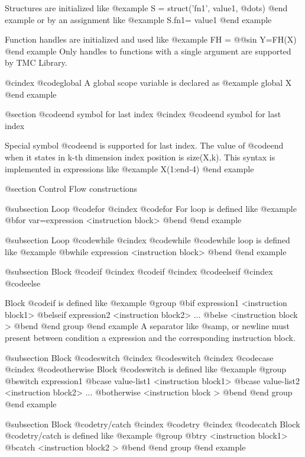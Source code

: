 Structures are initialized like
@example
 S =  struct('fn1', value1,  @dots{})
@end example
or by an assignment like
@example
 S.fn1= value1
@end example

Function handles are initialized and used like
@example
FH = @@sin   %
Y=FH(X) %
@end example
Only handles to functions with a single argument   are supported by TMC Library.



@cindex  @code{global}
A global scope variable is declared as
@example
 global X
@end example

@section @code{end} symbol for last index
@cindex  @code{end} symbol for last index

Special symbol @code{end} is supported for last index.
The value of @code{end} when it states in k-th dimension  index position is size(X,k).
This syntax is implemented in expressions like
@example
 X(1:end-4)
@end example



@section Control Flow  constructions

@subsection Loop @code{for}
@cindex  @code{for}
For loop is defined  like
@example
	@b{for} var=expression
		<instruction block>
	@b{end}
@end example

@subsection Loop @code{while}
@cindex  @code{while}
@code{while} loop is defined  like
@example
	@b{while} expression
		<instruction block>
	@b{end}
@end example

@subsection Block @code{if}
@cindex  @code{if}
@cindex  @code{elseif}
@cindex  @code{else}

Block @code{if} is defined  like
@example
@group
	@b{if} expression1
		<instruction block1>
	@b{elseif} expression2
		<instruction block2>
	...
	@b{else}
		<instruction block >
	@b{end}
@end group
@end example
A separator like @samp{,} or newline must present between condition a expression and the corresponding instruction block.

@subsection Block @code{switch}
@cindex  @code{switch}
@cindex  @code{case}
@cindex  @code{otherwise}
Block @code{switch} is defined  like
@example
@group
	@b{switch} expression1
	@b{case} value-list1
		<instruction block1>
	@b{case} value-list2
		<instruction block2>
	...
	@b{otherwise}
		<instruction block >
	@b{end}
@end group
@end example

@subsection Block @code{try/catch}
@cindex  @code{try}
@cindex  @code{catch}
Block @code{try/catch} is defined  like
@example
@group
	@b{try}  
 		<instruction block1>
	@b{catch}
		<instruction block2 >
	@b{end}
@end group
@end example

